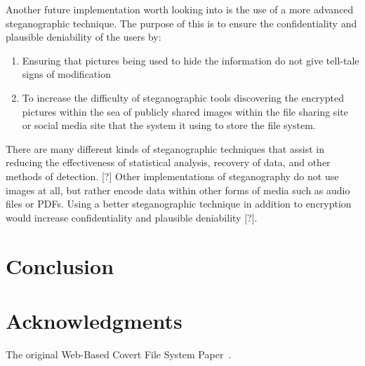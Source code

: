 \documentclass[12pt,journal,compsoc]{IEEEtran}
\begin{document}
Another future implementation worth looking into is the use of a more advanced steganographic technique. The purpose of this is to ensure the confidentiality and plausible deniability of the users by:
\begin{enumerate}
\item Ensuring that pictures being used to hide the information do not give tell-tale signs of modification
\item To increase the difficulty of steganographic tools discovering the encrypted pictures within the sea of publicly shared images within the file sharing site or social media site that the system it using to store the file system.
\end{enumerate}
There are many different kinds of steganographic techniques that assist in reducing the effectiveness of statistical analysis, recovery of data, and other methods of detection. [?] Other implementations of steganography do not use images at all, but rather encode data within other forms of media such as audio files or PDFs. Using a better steganographic technique in addition to encryption would increase confidentiality and plausible deniability [?]. %

%

\section{Conclusion}

\section{Acknowledgments}

The original Web-Based Covert File System Paper~\cite{Baliga2007}.


\end{document}
